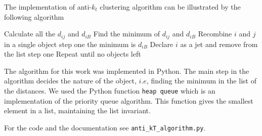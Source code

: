 The implementation of anti-$k_t$ clustering algorithm can be illustrated by the following algorithm 
\begin{algorithmic}
\State Calculate all the $d_{ij}$ and $d_{iB}$
\State Find the minimum of $d_{ij}$ and $d_{iB}$ 
	\State Recombine $i$ and $j$ in a single object 
	\State \Return step one
\Else \State the minimum is $d_{iB}$
	\State Declare $i$ as a jet and remove from the list
	\State \Return step one	
\EndIf
\State Repeat until no objects left
\end{algorithmic} 
The algorithm for this work was implemented in Python. The main step in the algorithm  decides the nature of the object, $i.e$, finding the minimum in the list of the distances. We used the Python function \verb+heap queue+ which is an implementation of the priority queue algorithm. This function gives the smallest element in a list, maintaining the list invariant. 

For the code and the documentation see \verb+anti_kT_algorithm.py+.